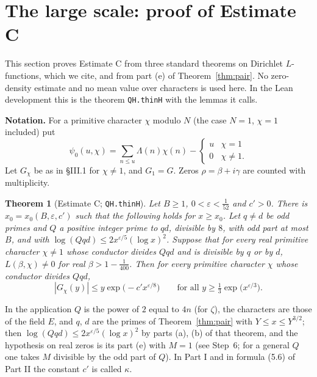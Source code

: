 \documentclass[11pt,letterpaper]{article}
\newtheorem{theorem}{Theorem}[section]
\begin{document}
\section{The large scale: proof of Estimate C}

This section proves Estimate C from three standard theorems on Dirichlet $L$-functions, which we cite, and
from part (e) of Theorem~\ref{thm:pair}. No zero-density estimate and no mean value over characters is
used here. In the Lean development this is the theorem \texttt{QH.thinH} with the lemmas it calls.

\textbf{Notation.} For a primitive character $\chi$ modulo $N$ (the case $N=1$, $\chi=1$ included) put
\begin{equation}\label{D:130}
 \psi_0(u,\chi)=\sum_{n\le u}\Lambda(n)\chi(n)-\begin{cases}u&\chi=1\\0&\chi\ne1.\end{cases}
\end{equation}
Let $G_\chi$ be as in \S III.1 for $\chi\ne1$, and $G_1=G$. Zeros $\rho=\beta+i\gamma$ are counted with
multiplicity.

\begin{theorem}[Estimate C; \texttt{QH.thinH}]\label{thm:C}
Let $B\ge1$, $0<\varepsilon<\frac1{52}$ and $c'>0$. There is $x_0=x_0(B,\varepsilon,c')$ such that the following holds for
$x\ge x_0$. Let $q\ne d$ be odd primes and $Q$ a positive integer prime to $qd$, divisible by $8$, with odd
part at most $B$, and with $\log(Qqd)\le2x^{\varepsilon/5}(\log x)^2$. Suppose that for every real primitive
character $\chi\ne1$ whose conductor divides $Qqd$ and is divisible by $q$ or by $d$, $L(\beta,\chi)\ne0$ for
real $\beta>1-\frac1{400}$. Then for every primitive character $\chi$ whose conductor divides $Qqd$,
\begin{equation}\label{D:131}
 |G_\chi(y)|\le y\exp\!\big(-c'x^{\varepsilon/8}\big)\qquad\text{for all }y\ge\tfrac13\exp\!\big(x^{\varepsilon/3}\big).
\end{equation}
\end{theorem}

\noindent In the application $Q$ is the power of $2$ equal to $4n$ (for $\zeta$), the characters are those of
the field $E$, and $q$, $d$ are the primes of Theorem~\ref{thm:pair} with $Y\le x\le Y^{3/2}$; then
$\log(Qqd)\le2x^{\varepsilon/5}(\log x)^2$ by parts (a), (b) of that theorem, and the hypothesis on real zeros
is its part (e) with $M=1$ (see Step~6; for a general $Q$ one takes $M$ divisible by the odd part of $Q$).
In Part I and in formula (5.6) of Part II the constant $c'$ is called $\kappa$.
\end{document}
